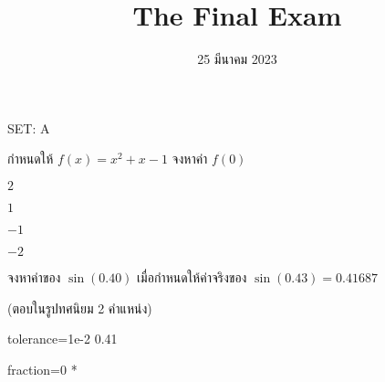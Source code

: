 \documentclass[12pt]{article}
\title{The Final Exam}
\date{25 มีนาคม 2023}
\begin{document}
\maketitle

\begin{quiz}{SET: A}

\begin{multi}[points=1, penalty=0,  numbering=none]{}
กำหนดให้ $f(x) = x^2 + x -1$ จงหาค่า $f(0)$
\item  $2$
\item * $1$ 
\item $-1$
\item $-2$  
\end{multi} 


\begin{numerical}[points=2]{}
จงหาค่าของ $\sin(0.40)$ เมื่อกำหนดให้ค่าจริงของ $\sin(0.43)=0.41687$

(ตอบในรูปทศนิยม 2 คำแหน่ง)
	\item[tolerance={1e-2}] 0.41
	\item[fraction=0] *
\end{numerical}



 \end{quiz}
 

 
\end{document}

